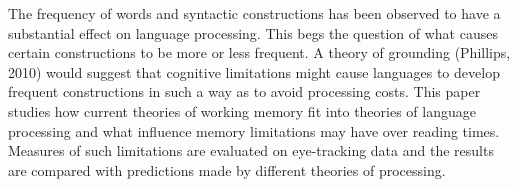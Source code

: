 The frequency of words and syntactic constructions has been observed to have a substantial effect on language processing. This begs the question of what
 causes certain constructions to be more or less frequent. A theory of grounding
 (Phillips, 2010) would suggest that cognitive limitations might cause languages
 to develop frequent constructions in such a way as to avoid processing costs.
 This paper studies how current theories of working memory fit into theories of
 language processing and what influence memory limitations may have over reading
 times. Measures of such limitations are evaluated on eye-tracking data and the
 results are compared with predictions made by different theories of processing.

